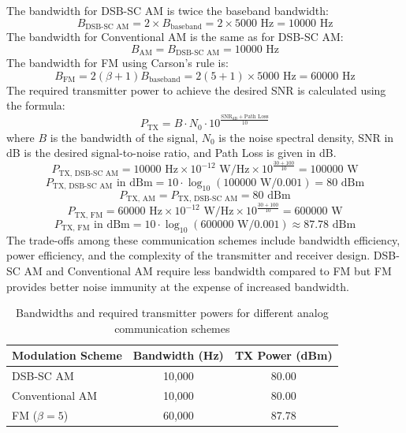 \documentclass{article}
\begin{document}
\noindent
The bandwidth for DSB-SC AM is twice the baseband bandwidth:
\[ B_{\text{DSB-SC AM}} = 2 \times B_{\text{baseband}} = 2 \times 5000 \text{ Hz} = 10000 \text{ Hz} \]
\newline
\noindent
The bandwidth for Conventional AM is the same as for DSB-SC AM:
\[ B_{\text{AM}} = B_{\text{DSB-SC AM}} = 10000 \text{ Hz} \]
\newline
\noindent
The bandwidth for FM using Carson's rule is:
\[ B_{\text{FM}} = 2 (\beta + 1) B_{\text{baseband}} = 2 (5 + 1) \times 5000 \text{ Hz} = 60000 \text{ Hz} \]
\newline
\noindent
The required transmitter power to achieve the desired SNR is calculated using the formula:
\[ P_{\text{TX}} = B \cdot N_0 \cdot 10^{\frac{\text{SNR}_{\text{dB}} + \text{Path Loss}}{10}} \]
where \( B \) is the bandwidth of the signal, \( N_0 \) is the noise spectral density, SNR in dB is the desired signal-to-noise ratio, and Path Loss is given in dB.
\noindent
\[ P_{\text{TX, DSB-SC AM}} = 10000 \text{ Hz} \times 10^{-12} \text{ W/Hz} \times 10^{\frac{30 + 100}{10}} = 100000 \text{ W} \]
\[ P_{\text{TX, DSB-SC AM}} \text{ in dBm} = 10 \cdot \log_{10}(100000 \text{ W} / 0.001) = 80 \text{ dBm} \]
\newline
\noindent
\[ P_{\text{TX, AM}} = P_{\text{TX, DSB-SC AM}} = 80 \text{ dBm} \]
\newline
\noindent
\[ P_{\text{TX, FM}} = 60000 \text{ Hz} \times 10^{-12} \text{ W/Hz} \times 10^{\frac{30 + 100}{10}} = 600000 \text{ W} \]
\[ P_{\text{TX, FM}} \text{ in dBm} = 10 \cdot \log_{10}(600000 \text{ W} / 0.001) \approx 87.78 \text{ dBm} \]
\noindent
The trade-offs among these communication schemes include bandwidth efficiency, power efficiency, and the complexity of the transmitter and receiver design. DSB-SC AM and Conventional AM require less bandwidth compared to FM but FM provides better noise immunity at the expense of increased bandwidth.
\newline
\begin{table}[h!]
\centering
\begin{tabular}{@{}lcc@{}}
\toprule
Modulation Scheme & Bandwidth (Hz) & TX Power (dBm) \\ \midrule
DSB-SC AM         & 10,000         & 80.00          \\
Conventional AM   & 10,000         & 80.00          \\
FM (\( \beta = 5 \)) & 60,000         & 87.78          \\ \bottomrule
\end{tabular}
\caption{Bandwidths and required transmitter powers for different analog communication schemes}
\end{table}
\end{document}
